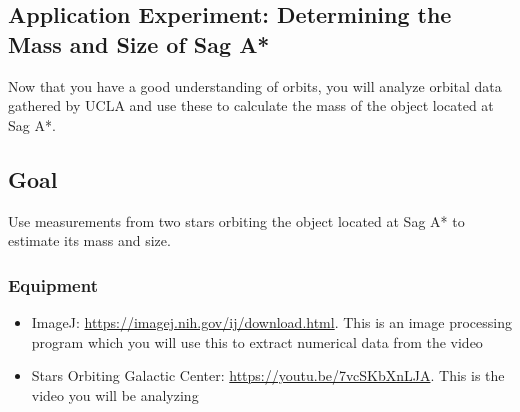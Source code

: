 \begin{itemize}
	
	

\section{Application Experiment: Determining the Mass and Size of Sag A*}
Now that you have a good understanding of orbits, you will analyze orbital data gathered by UCLA and use these to calculate the mass of the object located at Sag A*.

\subsection{Goal}

Use measurements from two stars orbiting the object located at Sag A* to estimate its mass and size. 

\subsubsection{Equipment}
\begin{itemize}
	\item ImageJ: \url{https://imagej.nih.gov/ij/download.html}. This is an image processing program which you will use this to extract numerical data from the video
	\item Stars Orbiting Galactic Center: \url{https://youtu.be/7vcSKbXnLJA}. This is the video you will be analyzing
\end{itemize}


\end{itemize}
